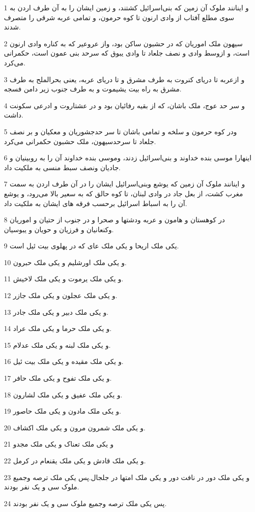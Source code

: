 \par 1 و اینانند ملوک آن زمین که بنی‌اسرائیل کشتند، و زمین ایشان را به آن طرف اردن به سوی مطلع آفتاب از وادی ارنون تا کوه حرمون، و تمامی عربه شرقی را متصرف شدند.
\par 2 سیهون ملک اموریان که در حشبون ساکن بود، واز عروعیر که به کناره وادی ارنون است، و ازوسط وادی و نصف جلعاد تا وادی یبوق که سرحد بنی عمون است، حکمرانی می‌کرد.
\par 3 و ازعربه تا دریای کنروت به طرف مشرق و تا دریای عربه، یعنی بحرالملح به طرف مشرق به راه بیت یشیموت و به طرف جنوب زیر دامن فسجه.
\par 4 و سر حد عوج، ملک باشان، که از بقیه رفائیان بود و در عشتاروت و ادرعی سکونت داشت.
\par 5 ودر کوه حرمون و سلخه و تمامی باشان تا سر حدجشوریان و معکیان و بر نصف جلعاد تا سرحدسیهون، ملک حشبون حکمرانی می‌کرد.
\par 6 اینهارا موسی بنده خداوند و بنی‌اسرائیل زدند، وموسی بنده خداوند آن را به روبینیان و جادیان ونصف سبط منسی به ملکیت داد. 
\par 7 و اینانند ملوک آن زمین که یوشع وبنی‌اسرائیل ایشان را در آن طرف اردن به سمت مغرب کشت، از بعل جاد در وادی لبنان، تا کوه حالق که به سعیر بالا می‌رود، و یوشع آن را به اسباط اسرائیل برحسب فرقه های ایشان به ملکیت داد.
\par 8 در کوهستان و هامون و عربه ودشتها و صحرا و در جنوب از حتیان و اموریان وکنعانیان و فرزیان و حویان و یبوسیان.
\par 9 یکی ملک اریحا و یکی ملک عای که در پهلوی بیت ئیل است.
\par 10 و یکی ملک اورشلیم و یکی ملک حبرون.
\par 11 و یکی ملک یرموت و یکی ملک لاخیش.
\par 12 و یکی ملک عجلون و یکی ملک جازر.
\par 13 و یکی ملک دبیر و یکی ملک جادر.
\par 14 و یکی ملک حرما و یکی ملک عراد.
\par 15 و یکی ملک لبنه و یکی ملک عدلام.
\par 16 و یکی ملک مقیده و یکی ملک بیت ئیل.
\par 17 و یکی ملک تفوح و یکی ملک حافر.
\par 18 و یکی ملک عفیق و یکی ملک لشارون.
\par 19 و یکی ملک مادون و یکی ملک حاصور.
\par 20 و یکی ملک شمرون مرون و یکی ملک اکشاف.
\par 21 و یکی ملک تعناک و یکی ملک مجدو
\par 22 و یکی ملک قادش و یکی ملک یقنعام در کرمل.
\par 23 و یکی ملک دور در نافت دور و یکی ملک امتها در جلجال.پس یکی ملک ترصه وجمیع ملوک سی و یک نفر بودند.
\par 24 پس یکی ملک ترصه وجمیع ملوک سی و یک نفر بودند.
 
